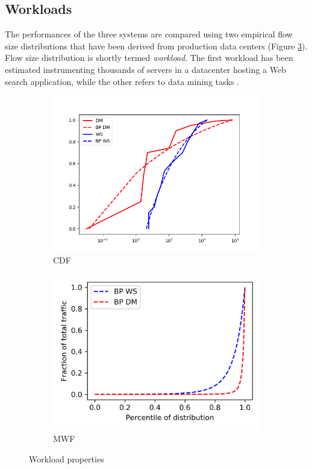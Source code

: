 \subsection{Workloads}
\label{sec:workloads}
The performances of the three systems are compared using two empirical flow size distributions that have been derived from production data centers (Figure \ref{fig:workloads}). Flow size distribution is shortly termed \emph{workload}. The first workload has been estimated instrumenting thousands of servers in a datacenter hosting a Web search \cite{dctcp} application, while the other refers to data mining tasks \cite{vl2}. 
\begin{figure}
	\centering
	\begin{subfigure}[b]{0.49\textwidth}
		\centering
		\includegraphics[width=\textwidth]{Chapter3/Figures/fits}
		\caption{CDF}
		\label{fig:cdfs}
	\end{subfigure}
   \hfill
   \begin{subfigure}[b]{0.49\textwidth}
   	\centering
   	\includegraphics[width=\textwidth]{Chapter3/Figures/mwf}
   	\caption{MWF}
   	\label{fig:mwf}
   \end{subfigure}
	\caption{Workload properties}
	\label{fig:workloads}
\end{figure}
